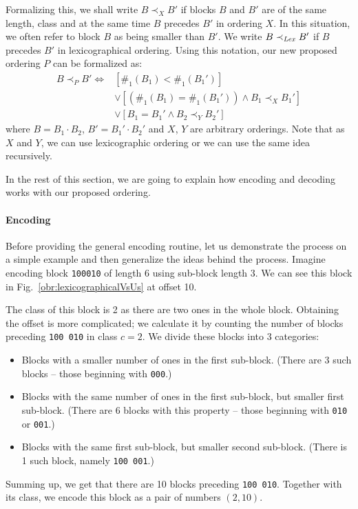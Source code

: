 Formalizing this, we shall write $B\prec_X B'$ if blocks $B$ and $B'$ are of
the same length, class and at the same time $B$ precedes $B'$ in ordering $X$.
In this situation, we often refer to block $B$ as being smaller than $B'$.
We write $B\prec_{\mathit{Lex}} B'$ if $B$ precedes $B'$ in lexicographical ordering.
Using this notation, our new proposed ordering $P$ can be formalized as:
\begin{align*}
    B\prec_P B' \iff
    &[\#_1(B_1) < \#_1(B_1')] \\
    &\lor [(\#_1(B_1) = \#_1(B_1')) \land B_1 \prec_{X} B_1']\\
    &\lor [B_1 = B_1' \land B_2 \prec_{Y} B_2']
\end{align*}
where $B=B_1\cdot B_2$, $B'=B_1'\cdot B_2'$ and $X$, $Y$ are arbitrary orderings.
Note that as $X$ and $Y$, we can use lexicographic ordering or we can use the same
idea recursively.

In the rest of this section, we are going to explain how encoding and decoding works
with our proposed ordering.

\paragraph{Encoding}

Before providing the general encoding routine, let us demonstrate the process on
a simple example and then generalize the ideas behind the process. Imagine encoding
block {\tt 100010} of length 6 using sub-block length 3. We can see this block in
Fig.~\ref{obr:lexicographicalVsUs} at offset 10. 

The class of this block is 2 as there are two ones in the whole block. Obtaining the
offset is more complicated; we calculate it by counting the number of blocks preceding
{\tt 100 010} in class $c=2$. We divide these blocks into 3 categories:
\begin{itemize}
    \item Blocks with a smaller number of ones in the first sub-block.
    (There are 3 such blocks -- those beginning with {\tt 000}.)
    \item Blocks with the same number of ones in the first sub-block, but smaller first sub-block.
    (There are 6 blocks with this property -- those beginning with {\tt 010} or {\tt 001}.)
    \item Blocks with the same first sub-block, but smaller second sub-block.
    (There is 1 such block, namely {\tt 100 001}.)
\end{itemize}
Summing up, we get that there are 10 blocks preceding {\tt 100 010}. Together with its class,
we encode this block as a pair of numbers $(2, 10)$.

